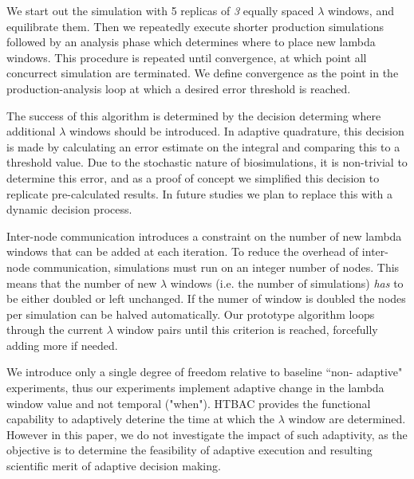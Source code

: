 We start out the simulation with 5 replicas of \emph{3} equally spaced
$\lambda$ windows, and equilibrate them. 
Then we repeatedly execute 
shorter production simulations followed by an analysis phase which determines where to
place new lambda windows. 
This procedure is repeated until convergence, at which point all
concurrect simulation are terminated. 
We define convergence as the point in
the production-analysis loop at which a desired error threshold is
reached. 

The success of this algorithm is determined by the decision determing 
where additional $\lambda$ windows should be introduced.
In adaptive quadrature, this decision is made by
calculating an error estimate on the integral and comparing this to a threshold value. 
Due to the stochastic nature of biosimulations, it is
non-trivial to determine this error, and as a proof of concept we simplified
this decision to replicate pre-calculated results. In future studies we plan
to replace this with a dynamic decision process.

Inter-node communication introduces a constraint on the number of new lambda windows that can be added at each iteration. 
To reduce the overhead of inter-node communication, simulations must run on an integer number of nodes. This means that the
number of new $\lambda$ windows (i.e. the number of simulations) \emph{has} to be
either doubled or left unchanged. 
If the numer of window is doubled the nodes per simulation can be halved automatically. 
Our prototype algorithm loops through the current $\lambda$ window pairs until this criterion is reached, forcefully adding more if needed.




We introduce only a single degree of freedom relative to baseline ``non-
adaptive" experiments, thus our experiments implement adaptive change in the
lambda window value and not temporal ("when"). HTBAC provides the functional
capability to adaptively deterine the time at which the $\lambda$ window are
determined. However in this paper, we do not investigate the impact of such
adaptivity, as the objective is to determine the feasibility of adaptive
execution and resulting scientific merit of adaptive decision making.




